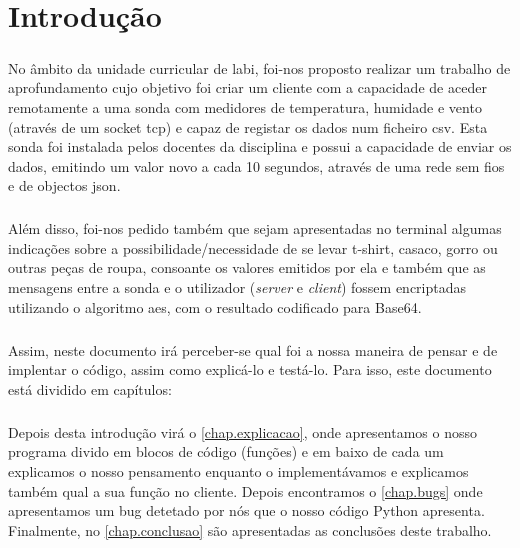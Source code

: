 \documentclass[a4paper]{report}
\begin{document}
\tableofcontents  

\clearpage
{}

\chapter{Introdução}
\label{chap.introducao}
\paragraph{}No âmbito da unidade curricular de \ac{labi}, foi-nos proposto realizar um trabalho de aprofundamento cujo objetivo foi criar um cliente com a capacidade de aceder remotamente a uma sonda com medidores de temperatura, humidade e vento (através de um socket \ac{tcp}) e capaz de registar os dados num ficheiro \ac{csv}.
Esta sonda foi instalada pelos docentes da disciplina e possui a capacidade de enviar os dados, emitindo um valor novo a cada 10 segundos, através de uma rede sem fios e de objectos \ac{json}.

\paragraph{}Além disso, foi-nos pedido também que sejam apresentadas no terminal algumas indicações sobre a possibilidade/necessidade de se levar t-shirt, casaco, gorro ou outras peças de roupa, consoante os valores emitidos por ela e também que as mensagens entre a sonda e o utilizador (\textit{server} e \textit{client}) fossem encriptadas utilizando o algoritmo \ac{aes}, com o resultado codificado para Base64.

\paragraph{}Assim, neste documento irá perceber-se qual foi a nossa maneira de pensar e de implentar o código, assim como explicá-lo e testá-lo. Para isso, este documento está dividido em  capítulos:

\paragraph{}Depois desta introdução virá o \autoref{chap.explicacao}, onde apresentamos o nosso programa divido em blocos de código (funções) e em baixo de cada um explicamos o nosso pensamento enquanto o implementávamos e explicamos também qual a sua função no cliente.
Depois encontramos o \autoref{chap.bugs} onde apresentamos um bug detetado por nós que o nosso código Python apresenta.
Finalmente, no \autoref{chap.conclusao} são apresentadas as conclusões deste trabalho.
\end{document}
